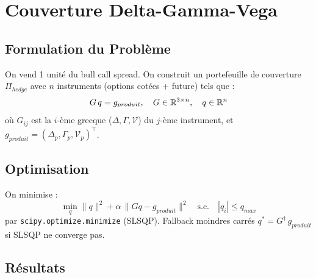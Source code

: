 \section{Couverture Delta-Gamma-Vega}
\label{sec:couverture}

\subsection{Formulation du Problème}

On vend 1 unité du bull call spread. On construit un portefeuille de couverture
$\Pi_{hedge}$ avec $n$ instruments (options cotées + future) tels que :
\begin{equation}
  G\,q = g_{produit},\quad G \in \mathbb{R}^{3\times n},\quad q \in \mathbb{R}^n
  \label{eq:hedge_system}
\end{equation}
où $G_{ij}$ est la $i$-ème grecque ($\Delta, \Gamma, \mathcal{V}$) du $j$-ème instrument,
et $g_{produit} = (\Delta_p, \Gamma_p, \mathcal{V}_p)^\top$.

\subsection{Optimisation}

On minimise :
\begin{equation}
  \min_q \|q\|^2 + \alpha\,\|Gq - g_{produit}\|^2
  \quad \text{s.c.} \quad |q_i| \leq q_{max}
\end{equation}
par \texttt{scipy.optimize.minimize} (SLSQP). Fallback moindres carrés
$q^* = G^\dagger\,g_{produit}$ si SLSQP ne converge pas.

\subsection{Résultats}

